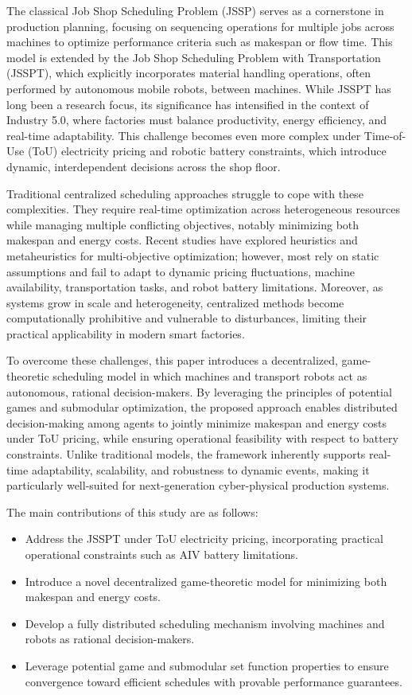 \documentclass[preprint, 3p, review, 12pt]{elsarticle}
\begin{document}
The classical Job Shop Scheduling Problem (JSSP) serves as a cornerstone in production planning, focusing on sequencing operations for multiple jobs across machines to optimize performance criteria such as makespan or flow time. This model is extended by the Job Shop Scheduling Problem with Transportation (JSSPT), which explicitly incorporates material handling operations, often performed by autonomous mobile robots, between machines. While JSSPT has long been a research focus, its significance has intensified in the context of Industry 5.0, where factories must balance productivity, energy efficiency, and real-time adaptability. This challenge becomes even more complex under Time-of-Use (ToU) electricity pricing and robotic battery constraints, which introduce dynamic, interdependent decisions across the shop floor.

Traditional centralized scheduling approaches struggle to cope with these complexities. They require real-time optimization across heterogeneous resources while managing multiple conflicting objectives, notably minimizing both makespan and energy costs. Recent studies have explored heuristics and metaheuristics for multi-objective optimization; however, most rely on static assumptions and fail to adapt to dynamic pricing fluctuations, machine availability, transportation tasks, and robot battery limitations. Moreover, as systems grow in scale and heterogeneity, centralized methods become computationally prohibitive and vulnerable to disturbances, limiting their practical applicability in modern smart factories.

To overcome these challenges, this paper introduces a decentralized, game-theoretic scheduling model in which machines and transport robots act as autonomous, rational decision-makers. By leveraging the principles of potential games and submodular optimization, the proposed approach enables distributed decision-making among agents to jointly minimize makespan and energy costs under ToU pricing, while ensuring operational feasibility with respect to battery constraints. Unlike traditional models, the framework inherently supports real-time adaptability, scalability, and robustness to dynamic events, making it particularly well-suited for next-generation cyber-physical production systems.

The main contributions of this study are as follows:
\begin{itemize}
    \item Address the JSSPT under ToU electricity pricing, incorporating practical operational constraints such as AIV battery limitations.
    \item Introduce a novel decentralized game-theoretic model for minimizing both makespan and energy costs.
    \item Develop a fully distributed scheduling mechanism involving machines and robots as rational decision-makers.
    \item Leverage potential game and submodular set function properties to ensure convergence toward efficient schedules with provable performance guarantees.
\end{itemize}
\end{document}
